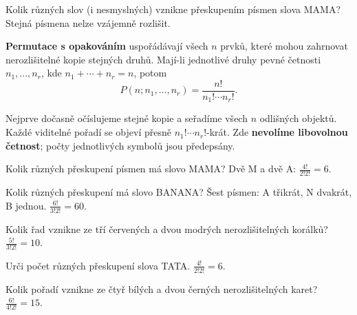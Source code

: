 \documentclass[11pt,a4paper]{article}
\begin{document}

Kolik různých slov (i nesmyslných) vznikne přeskupením písmen slova MAMA? Stejná písmena nelze vzájemně rozlišit.



\begin{definiceBox}
\textbf{Permutace s opakováním} uspořádávají všech $n$ prvků, které mohou zahrnovat nerozlišitelné kopie stejných druhů. Mají-li jednotlivé druhy pevné četnosti $n_1,\ldots,n_r$, kde $n_1+\cdots+n_r=n$, potom
\[
P(n;n_1,\ldots,n_r)=\frac{n!}{n_1!\cdots n_r!}.
\]
\end{definiceBox}
Nejprve dočasně očíslujeme stejné kopie a seřadíme všech $n$ odlišných objektů. Každé viditelné pořadí se objeví přesně $n_1!\cdots n_r!$-krát. Zde \textbf{nevolíme libovolnou četnost}; počty jednotlivých symbolů jsou předepsány.


\begin{prikladReseniBox}[title={Příklad 1}]
Kolik různých přeskupení písmen má slovo MAMA?
\tcblower
Dvě M a dvě A: $\frac{4!}{2!2!}=6$.
\end{prikladReseniBox}



\begin{prikladReseniBox}[title={Příklad 2}]
Kolik různých přeskupení má slovo BANANA?
\tcblower
Šest písmen: A třikrát, N dvakrát, B jednou. $\frac{6!}{3!2!}=60$.
\end{prikladReseniBox}



\begin{prikladReseniBox}[title={Příklad 3}]
Kolik řad vznikne ze tří červených a dvou modrých nerozlišitelných korálků?
\tcblower
$\frac{5!}{3!2!}=10$.
\end{prikladReseniBox}




\begin{zadaniReseniBox}[title={Samostatná práce 1}]
Urči počet různých přeskupení slova TATA.
\tcblower
$\frac{4!}{2!2!}=6$.
\end{zadaniReseniBox}



\begin{zadaniReseniBox}[title={Samostatná práce 2}]
Kolik pořadí vznikne ze čtyř bílých a dvou černých nerozlišitelných karet?
\tcblower
$\frac{6!}{4!2!}=15$.
\end{zadaniReseniBox}
\end{document}
